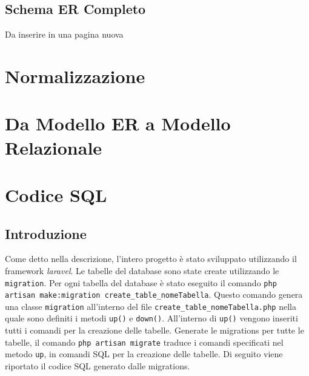 \documentclass[paper=a4, fontsize=11pt,x11names]{report}
\begin{document}

\clearpage
\section{Schema ER Completo}
Da inserire in una pagina nuova

\chapter{Normalizzazione}

\chapter{Da Modello ER a Modello Relazionale}



\chapter{Codice SQL}
\section{Introduzione}
Come detto nella descrizione, l'intero progetto è stato sviluppato utilizzando il framework \textit{laravel}. Le tabelle del database sono state create utilizzando le \texttt{migration}. Per ogni tabella del database è stato eseguito il comando \texttt{php artisan make:migration create\_table\_nomeTabella}. Questo comando genera una classe \texttt{migration} all'interno del file \texttt{create\_table\_nomeTabella.php} nella quale sono definiti i metodi \texttt{up()} e \texttt{down()}. All'interno di \texttt{up()} vengono inseriti tutti i comandi per la creazione delle tabelle. Generate le migrations per tutte le tabelle, il comando \texttt{php artisan migrate} traduce i comandi specificati nel metodo \texttt{up}, in comandi SQL per la creazione delle tabelle. Di seguito viene riportato il codice SQL generato dalle migrations.
\end{document}

